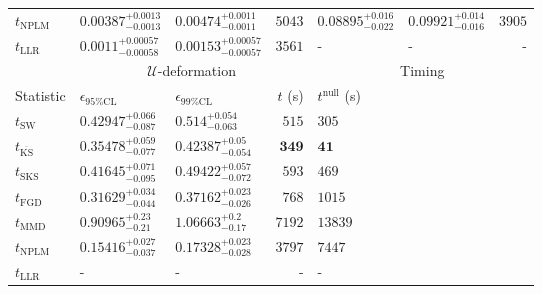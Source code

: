 \begin{tabular}{l|llr|llr}
\rowcolor{red!35}	$t_{\mathrm{NPLM}}$ & $0.00387_{-0.0013}^{+0.0013}$ & $0.00474_{-0.0011}^{+0.0011}$ & $5043$ & $0.08895_{-0.022}^{+0.016}$ & $0.09921_{-0.016}^{+0.014}$ & $3905$ \\
	$t_{\mathrm{LLR}}$ & $0.0011_{-0.00058}^{+0.00057}$ & $0.00153_{-0.00057}^{+0.00057}$ & $3561$ & - & - & - \\
	\toprule
	\multicolumn{1}{c}{} & \multicolumn{3}{c}{$\mathcal{U}$-deformation} & \multicolumn{3}{c}{Timing} \\
	Statistic & $\epsilon_{95\%\mathrm{CL}}$ & $\epsilon_{99\%\mathrm{CL}}$ & $t$ (s) & $t^{\mathrm{null}}$ (s) \\
	\midrule
	$t_{\mathrm{SW}}$ & $0.42947_{-0.087}^{+0.066}$ & $0.514_{-0.063}^{+0.054}$ & $515$ & $305$ \\
	$t_{\overline{\mathrm{KS}}}$ & $0.35478_{-0.077}^{+0.059}$ & $0.42387_{-0.054}^{+0.05}$ & ${\mathbf{349}}$ & ${\mathbf{41}}$ \\
	$t_{\mathrm{SKS}}$ & $0.41645_{-0.095}^{+0.071}$ & $0.49422_{-0.072}^{+0.057}$ & $593$ & $469$ \\
	$t_{\mathrm{FGD}}$ & ${\mathbf{0.31629_{-0.044}^{+0.034}}}$ & ${\mathbf{0.37162_{-0.026}^{+0.023}}}$ & $768$ & $1015$ \\
	$t_{\mathrm{MMD}}$ & $0.90965_{-0.21}^{+0.23}$ & $1.06663_{-0.17}^{+0.2}$ & $7192$ & $13839$ \\
\rowcolor{red!35}	$t_{\mathrm{NPLM}}$ & $0.15416_{-0.037}^{+0.027}$ & $0.17328_{-0.028}^{+0.023}$ & $3797$ & $7447$ \\
	$t_{\mathrm{LLR}}$ & - & - & - & - \\
	\bottomrule
\end{tabular}
